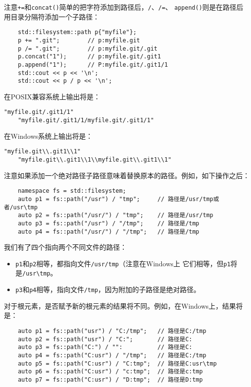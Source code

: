 注意\texttt{+=}和\texttt{concat()}简单的把字符添加到路径后，\texttt{/}、\texttt{/=}、
\texttt{append()}则是在路径后用目录分隔符添加一个子路径：
\begin{lstlisting}
    std::filesystem::path p{"myfile"};
    p += ".git";        // p:myfile.git
    p /= ".git";        // p:myfile.git/.git
    p.concat("1");      // p:myfile.git/.git1
    p.append("1");      // P:myfile.git/.git1/1
    std::cout << p << '\n';
    std::cout << p / p << '\n';
\end{lstlisting}
在POSIX兼容系统上输出将是：
\begin{lstlisting}[stringstyle=\color{black}]
    "myfile.git/.git1/1"
    "myfile.git/.git1/1/myfile.git/.git1/1"
\end{lstlisting}
在Windows系统上输出将是：
\begin{lstlisting}[stringstyle=\color{black}]
    "myfile.git\\.git1\\1"
    "myfile.git\\.git1\\1\\myfile.git\\.git1\\1"
\end{lstlisting}
注意如果添加一个绝对路径子路径意味着替换原本的路径。例如，如下操作之后：
\begin{lstlisting}
    namespace fs = std::filesystem;
    auto p1 = fs::path("/usr") / "tmp";     // 路径是/usr/tmp或者/usr\tmp
    auto p2 = fs::path("/usr/") / "tmp";    // 路径是/usr/tmp
    auto p3 = fs::path("/usr") / "/tmp";    // 路径是/tmp
    auto p4 = fs::path("/usr/") / "/tmp";   // 路径是/tmp
\end{lstlisting}
我们有了四个指向两个不同文件的路径：
\begin{itemize}
    \item \texttt{p1}和\texttt{p2}相等，都指向文件\texttt{/usr/tmp}（注意在Windows上
    它们相等，但\texttt{p1}将是\texttt{/usr\textbackslash tmp}。
    \item \texttt{p3}和\texttt{p4}相等，指向文件\texttt{/tmp}，因为附加的子路径是绝对路径。
\end{itemize}
对于根元素，是否赋予新的根元素的结果将不同。例如，在Windows上，结果将是：
\begin{lstlisting}
    auto p1 = fs::path("usr") / "C:/tmp";   // 路径是C:/tmp
    auto p2 = fs::path("usr") / "C:";       // 路径是C:
    auto p3 = fs::path("C:") / "":          // 路径是C:
    auto p4 = fs::path("C:usr") / "/tmp";   // 路径是C:/tmp
    auto p5 = fs::path("C:usr") / "C:tmp";  // 路径是C:usr\tmp
    auto p6 = fs::path("C:usr") / "c:tmp";  // 路径是c:tmp
    auto p7 = fs::path("C:usr") / "D:tmp";  // 路径是D:tmp
\end{lstlisting}
